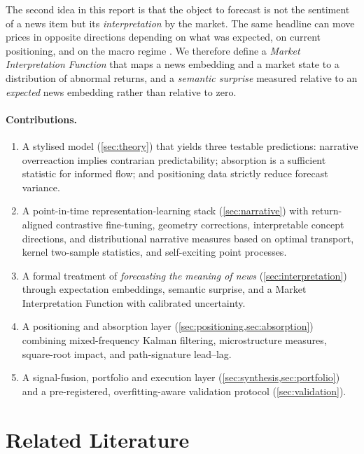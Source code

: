 \documentclass[11pt,a4paper]{article}
\theoremstyle{plain}
\theoremstyle{definition}
\theoremstyle{remark}
\begin{document}
The second idea in this report is that the object to forecast is not the sentiment of a news item but its \emph{interpretation} by the market. The same headline can move prices in opposite directions depending on what was expected, on current positioning, and on the macro regime \citep{veronesi1999}. We therefore define a \emph{Market Interpretation Function} that maps a news embedding and a market state to a distribution of abnormal returns, and a \emph{semantic surprise} measured relative to an \emph{expected} news embedding rather than relative to zero.

\paragraph{Contributions.}
\begin{enumerate}[label=\textbf{C\arabic*.}]
  \item A stylised model (\cref{sec:theory}) that yields three testable predictions: narrative overreaction implies contrarian predictability; absorption is a sufficient statistic for informed flow; and positioning data strictly reduce forecast variance.
  \item A point-in-time representation-learning stack (\cref{sec:narrative}) with return-aligned contrastive fine-tuning, geometry corrections, interpretable concept directions, and distributional narrative measures based on optimal transport, kernel two-sample statistics, and self-exciting point processes.
  \item A formal treatment of \emph{forecasting the meaning of news} (\cref{sec:interpretation}) through expectation embeddings, semantic surprise, and a Market Interpretation Function with calibrated uncertainty.
  \item A positioning and absorption layer (\cref{sec:positioning,sec:absorption}) combining mixed-frequency Kalman filtering, microstructure measures, square-root impact, and path-signature lead--lag.
  \item A signal-fusion, portfolio and execution layer (\cref{sec:synthesis,sec:portfolio}) and a pre-registered, overfitting-aware validation protocol (\cref{sec:validation}).
\end{enumerate}

\section{Related Literature}\label{sec:literature}
\end{document}
